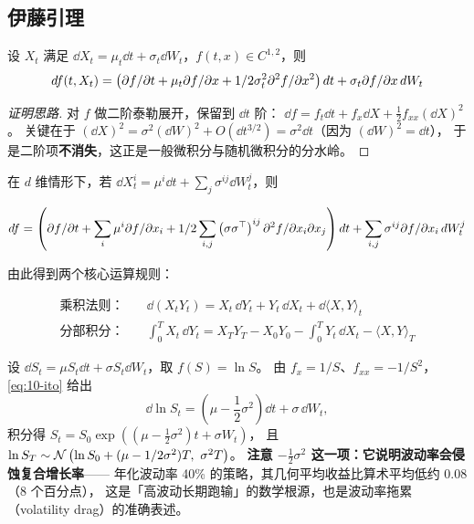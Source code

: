 \subsection{伊藤引理}

\begin{theorem}[伊藤引理，一维]\label{thm:10-ito}
设 $X_t$ 满足 $\dd X_t = \mu_t\dd t+\sigma_t\dd W_t$，$f(t,x)\in C^{1,2}$，则
\begin{equation}
  d f(t,X_t) = \left(\partial f/\partial t+\mu_t\partial f/\partial x+1/2\sigma_t^{2}\partial^2 f/\partial x^2\right)d t
              + \sigma_t\partial f/\partial x\,d W_t
  \label{eq:10-ito}
\end{equation}
\end{theorem}

\begin{proof}[证明思路]
对 $f$ 做二阶泰勒展开，保留到 $\dd t$ 阶：
$\dd f = f_t\dd t+f_x\dd X+\frac12f_{xx}(\dd X)^2$。
关键在于 $(\dd X)^2 = \sigma^2(\dd W)^2 + O(\dd t^{3/2}) = \sigma^2\dd t$（因为 $(\dd W)^2=\dd t$），
于是二阶项\textbf{不消失}，这正是一般微积分与随机微积分的分水岭。
\end{proof}

在 $d$ 维情形下，若 $\dd X^i_t = \mu^i\dd t+\sum_j\sigma^{ij}\dd W^j_t$，则

\begin{equation}
  d f = \left(\partial f/\partial t+\sum_i\mu^i\partial f/\partial x_i
        +1/2\sum_{i,j}\left(\sigma\sigma^{\top}\right)^{ij}\partial^2 f/\partial x_i\partial x_j\right)d t
        +\sum_{i,j}\sigma^{ij}\partial f/\partial x_i\,d W^j_t
  \label{eq:10-ito-multi}
\end{equation}

由此得到两个核心运算规则：

\begin{align}
  \text{乘积法则：}\quad & \dd(X_tY_t) = X_t\,\dd Y_t+Y_t\,\dd X_t+\dd\langle X,Y\rangle_t \label{eq:10-product}\\
  \text{分部积分：}\quad & \int_0^{T}X_t\,\dd Y_t = X_TY_T-X_0Y_0-\int_0^{T}Y_t\,\dd X_t-\langle X,Y\rangle_T \label{eq:10-ibp}
\end{align}

\begin{example}[几何布朗运动的对数形式]\label{ex:10-gbm}
设 $\dd S_t = \mu S_t\dd t+\sigma S_t\dd W_t$，取 $f(S)=\ln S$。
由 $f_x = 1/S$、$f_{xx} = -1/S^2$，\cref{eq:10-ito} 给出
\[
  \dd\ln S_t = \left(\mu-\frac12\sigma^{2}\right)\dd t+\sigma\,\dd W_t,
\]
积分得 $S_t = S_0\exp\left(\left(\mu-\frac12\sigma^2\right)t+\sigma W_t\right)$，
且 $\ln S_T\sim\mathcal{N}\left(\ln S_0+(\mu-1/2\sigma^2)T,\ \sigma^2T\right)$。
\textbf{注意 $-\frac12\sigma^2$ 这一项：它说明波动率会侵蚀复合增长率}——
年化波动率 40\% 的策略，其几何平均收益比算术平均低约 $0.08$（8 个百分点），
这是「高波动长期跑输」的数学根源，也是波动率拖累（volatility drag）的准确表述。
\end{example}

